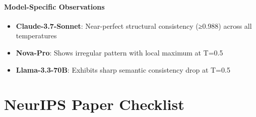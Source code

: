\documentclass{article}
\begin{document}
\paragraph{Model-Specific Observations}
\begin{itemize}
\item \textbf{Claude-3.7-Sonnet}: Near-perfect structural consistency (≥0.988) across all temperatures
\item \textbf{Nova-Pro}: Shows irregular pattern with local maximum at T=0.5
\item \textbf{Llama-3.3-70B}: Exhibits sharp semantic consistency drop at T=0.5
\end{itemize}

\newpage
\section*{NeurIPS Paper Checklist}
\end{document}
